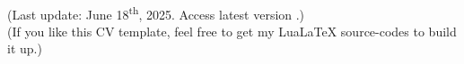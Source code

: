 \documentclass[localFont]{awesome-source-cv} %
\begin{document}
	\makecvheader

	
	
	

	\noindent \\		
	(Last update: June 18\textsuperscript{th}, 2025. Access latest version .)\\
	(If you like this CV template, feel free to get  \hspace{0.35 mm} my LuaLaTeX source-codes to build it up.)
\end{document}

